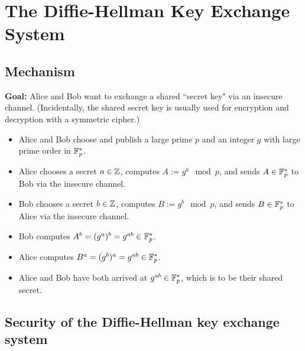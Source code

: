 
\section{The Diffie-Hellman Key Exchange System}
\setcounter{theorem}{0}
\setcounter{equation}{0}

\subsection{Mechanism}

\textbf{Goal:} Alice and Bob want to exchange a shared ``secret key" via an insecure channel.
(Incidentally, the shared secret key is usually used for encryption and decryption with a symmetric cipher.)
\begin{itemize}
\item	Alice and Bob choose and publish a large prime $p$ and an integer $g$ with large prime order in $\mathbb{F}_{p}^{*}$.
\item	Alice chooses a secret $a \in \mathbb{Z}$, computes $A := g^{a} \mod p$, and sends $A \in\mathbb{F}_{p}^{*}$ to Bob
		via the insecure channel.
\item	Bob chooses a secret $b \in \mathbb{Z}$, computes $B := g^{b} \mod p$, and sends $B \in\mathbb{F}_{p}^{*}$ to Alice
		via the insecure channel.
\item	Bob computes $A^{b} = (g^{a})^{b} = g^{ab} \in \mathbb{F}_{p}^{*}$.
\item	Alice computes $B^{a} = (g^{b})^{a} = g^{ab} \in \mathbb{F}_{p}^{*}$.
\item	Alice and Bob have both arrived at $g^{ab} \in \mathbb{F}_{p}^{*}$, which is to be their shared secret.
\end{itemize}

\subsection{Security of the Diffie-Hellman key exchange system}

